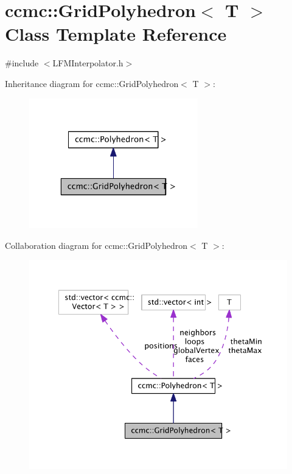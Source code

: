 \hypertarget{classccmc_1_1_grid_polyhedron}{\section{ccmc\-:\-:Grid\-Polyhedron$<$ T $>$ Class Template Reference}
\label{classccmc_1_1_grid_polyhedron}
}


{\ttfamily \#include $<$L\-F\-M\-Interpolator.\-h$>$}



Inheritance diagram for ccmc\-:\-:Grid\-Polyhedron$<$ T $>$\-:\nopagebreak
\begin{figure}[H]
\begin{center}
\leavevmode
\includegraphics[width=208pt]{classccmc_1_1_grid_polyhedron__inherit__graph}
\end{center}
\end{figure}


Collaboration diagram for ccmc\-:\-:Grid\-Polyhedron$<$ T $>$\-:\nopagebreak
\begin{figure}[H]
\begin{center}
\leavevmode
\includegraphics[width=345pt]{classccmc_1_1_grid_polyhedron__coll__graph}
\end{center}
\end{figure}
